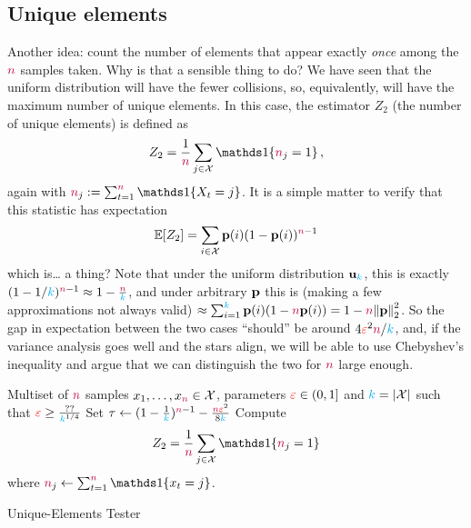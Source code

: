 \subsection{Unique elements} Another idea: count the number of elements that appear exactly \emph{once} among the ${\textcolor{purple}{n}}$ samples taken. Why is that a sensible thing to do? We have seen that the uniform distribution will have the fewer collisions, so, equivalently, will have the maximum number of unique elements. In this case, the estimator $Z_2$ (the number of unique elements) is defined as
\begin{equation}
  \label{eq:def:z2}
    Z_2 = \frac{1}{\ns} \sum_{j\in\domain} \indic{\ns_j=1}\,,
\end{equation}
again with $\ns_j \eqdef \sum_{t=1}^\ns \indic{X_t=j}$. It is a simple matter to verify that this statistic has expectation
\begin{equation}
  \label{eq:z2:expectation}
  \expect{Z_2} = \sum_{i\in\domain} \p(i)(1-\p(i))^{\ns-1}
\end{equation}
which is\dots{} a thing? Note that under the uniform distribution $\mathbf{u}_{\textcolor{cyan}{k}}$, this is exactly $(1-1/{\textcolor{cyan}{k}})^{{\textcolor{purple}{n}}-1}\approx 1 - \frac{{\textcolor{purple}{n}}}{{\textcolor{cyan}{k}}}$, and under arbitrary $\mathbf{p}$ this is (making a few approximations not always valid) $\approx \sum_{i=1}^\ab \p(i)(1-\ns\p(i)) = 1 - \ns\normtwo{\p}^2$. So the gap in expectation between the two cases ``should'' be around $4\textcolor{red}{\varepsilon}^2{\textcolor{purple}{n}}/{\textcolor{cyan}{k}}$, and, if the variance analysis goes well and the stars align, we will be able to use Chebyshev's inequality and argue that we can distinguish the two for ${\textcolor{purple}{n}}$ large enough.

\begin{algorithm}[ht!]
  \begin{algorithmic}[1]
    \Require Multiset of ${\textcolor{purple}{n}}$ samples $x_1,\dots,x_{\textcolor{purple}{n}} \in \mathcal{X}$, parameters $\textcolor{red}{\varepsilon}\in(0,1]$ and $\ab = \abs{\domain}$ such that $\textcolor{red}{\varepsilon} \geq \frac{??}{{\textcolor{cyan}{k}}^{1/4}}$
    \State Set $\tau \gets (1-\frac{1}{{\textcolor{cyan}{k}}})^{{\textcolor{purple}{n}}-1}-\frac{{\textcolor{purple}{n}}\textcolor{red}{\varepsilon}^2}{8{\textcolor{cyan}{k}}}$ 
    \State Compute 
    \[
        Z_2 = \frac{1}{\ns} \sum_{j\in\domain} \indic{\ns_j=1}
    \] where $\ns_j \gets \sum_{t=1}^\ns\indic{x_t=j}$.
     \Return \reject {}
    \Else\ 
      \Return \accept {}
    \EndIf
  \end{algorithmic}
  \caption{\label{algo:unique-elements}\sc Unique-Elements Tester}
\end{algorithm}

